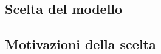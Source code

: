 \subsection{Scelta del modello}\label{sec:Scelta-modello}


\subsection{Motivazioni della scelta}\label{sec:Motivazioni}

    

